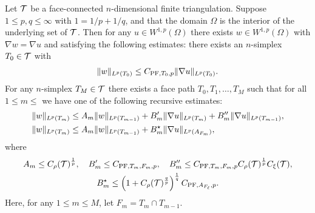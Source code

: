 \documentclass[10pt,a4paper]{article}
\begin{document}
\begin{theorem}\label{theorem:poincarefriedrichsestimate:grad}
    Let ${\mathcal T}$ be a face-connected $n$-dimensional finite triangulation. 
    Suppose $1 \leq p,q \leq \infty$ with $1 = 1/p + 1/q$,
    and that the domain $\Omega$ is the interior of the underlying set of ${\mathcal T}$. 
    Then for any $u \in W^{1,p}(\Omega)$ 
    there exists $w \in W^{1,p}(\Omega)$ with $\nabla w = \nabla u$ 
    and satisfying the following estimates:
    there exists an $n$-simplex $T_0 \in {\mathcal T}$ with 
    \begin{gather*}
        \| w \|_{L^{p}(T_{0})} \leq C_{{{\rm PF}},T_{0},p} \| \nabla u \|_{L^{p}(T_{0})}.
    \end{gather*}
    For any $n$-simplex $T_M \in {\mathcal T}$ there exists a face path $T_0, T_1, \dots, T_M$
    such that for all $1 \leq m \leq$ we have one of the following recursive estimates:
    \begin{align*}
        \| w \|_{L^{p}(T_{m})}
        &
        \leq  
        A_{m}
        \| w \|_{L^{p}(T_{m-1})} 
        +
        B'_{m}
        \| \nabla u \|_{L^{p}(T_{m  })} 
        + 
        B''_{m}
        \| \nabla u \|_{L^{p}(T_{m-1})} 
        ,
        \\
        \| w \|_{L^{p}(T_{m})}
        &
        \leq  
        A_{m}
        \| w \|_{L^{p}(T_{m-1})} 
        +
        B^\star_{m}
        \| \nabla u \|_{L^{p}(A_{F_m})} 
        , 
    \end{align*}
    where 
    \begin{gather*}
        A_{m} 
        \leq
        C_\rho({\mathcal T})^{\frac 1 p} 
        ,
        \quad 
        B'_{m} 
        \leq 
        C_{{\rm PF},T_{m},F_{m},p} 
        ,
        \quad 
        B''_{m} 
        \leq 
        C_{{\rm PF},T_{m},F_{m},p} C_\rho({\mathcal T})^{\frac 1 p} C_\xi({\mathcal T}) 
        ,
        \\
        B_{m}^\star
        \leq 
        \left( 1 + C_\rho({\mathcal T})^{\frac q p} \right)^{\frac 1 q}
        C_{{{\rm PF}},A_{F_\ell},p} 
        .
    \end{gather*}
    Here, for any $1 \leq m \leq M$, let $F_m = T_m \cap T_{m-1}$.
\end{theorem}
\end{document}
